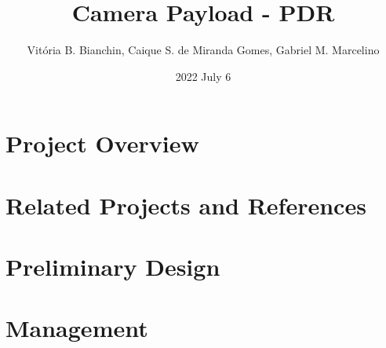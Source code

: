 \documentclass{beamer}
\title[Presentation]{Camera Payload - PDR}
\author[SpaceLab]{Vitória B. Bianchin, Caique S. de Miranda Gomes, Gabriel M. Marcelino}
\institute[]{SpaceLab - UFSC}
\date{2022 July 6}
\begin{document}
    
    

    \section{Project Overview}

        

    \section{Related Projects and References}

        

    \section{Preliminary Design}

        

    \section{Management}

        

\end{document}
